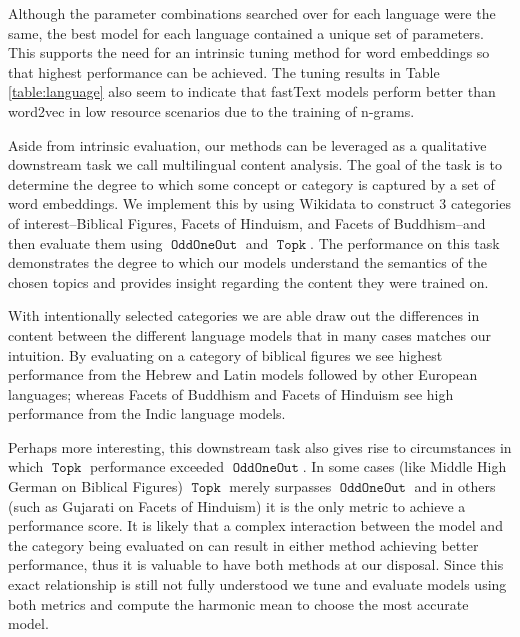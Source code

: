 \documentclass[11pt,a4paper]{article}
\DeclareMathOperator{\OddOneOut}{\texttt{OddOneOut}}
\DeclareMathOperator{\topk}{\texttt{Topk}}
\begin{document}
Although the parameter combinations searched over for each language were the same,
the best model for each language contained a unique set of parameters. 
This supports the need for an intrinsic tuning method for word embeddings so that highest performance can be achieved. 
The tuning results in Table \ref{table:language} also seem to indicate that fastText models perform better than word2vec in low resource scenarios 
 due to the training of n-grams.


Aside from intrinsic evaluation, our methods can be leveraged as a qualitative downstream task we call multilingual content analysis.
The goal of the task is to determine the degree to which some concept or category is captured by a set of word embeddings. 
We implement this by using Wikidata to construct $3$ categories of interest--Biblical Figures, Facets of Hinduism, and Facets of Buddhism--and then evaluate them using $\OddOneOut$ and $\topk$. 
The performance on this task demonstrates the degree to which our models understand the semantics of the chosen topics 
and provides insight regarding the content they were trained on.

With intentionally selected categories we are able draw out the differences in content between the different language models
that in many cases matches our intuition. 
By evaluating on a category of biblical figures we see highest performance from the Hebrew and Latin models followed by other European languages; 
whereas Facets of Buddhism and Facets of Hinduism see high performance from the Indic language models.

Perhaps more interesting, this downstream task also gives rise to circumstances in which $\topk$ performance exceeded $\OddOneOut$. 
In some cases (like Middle High German on Biblical Figures) $\topk$ merely surpasses $\OddOneOut$ 
and in others (such as Gujarati on Facets of Hinduism) it is the only metric to achieve a performance score. 
It is likely that a complex interaction between the model and the category being evaluated on can result in either method achieving better performance, 
thus it is valuable to have both methods at our disposal. 
Since this exact relationship is still not fully understood we tune and evaluate models using both metrics 
and compute the harmonic mean to choose the most accurate model.
\end{document}

